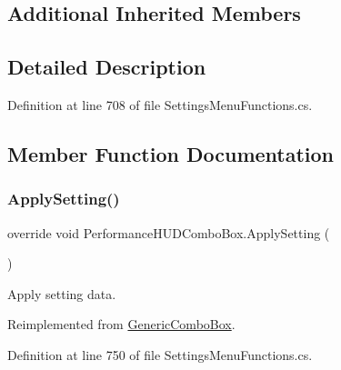 \subsection*{Additional Inherited Members}


\subsection{Detailed Description}


Definition at line 708 of file Settings\+Menu\+Functions.\+cs.



\subsection{Member Function Documentation}
\mbox{\label{class_performance_h_u_d_combo_box_a80ec71a44640dad18ea4da16ecb39fb7}} 
\subsubsection{\texorpdfstring{Apply\+Setting()}{ApplySetting()}}
{\footnotesize\ttfamily override void Performance\+H\+U\+D\+Combo\+Box.\+Apply\+Setting (\begin{DoxyParamCaption}{ }\end{DoxyParamCaption})\hspace{0.3cm}{\ttfamily [virtual]}}



Apply setting data. 



Reimplemented from \hyperlink{class_generic_combo_box_a5aced71f035bd463a4ebaaffe19ec547}{Generic\+Combo\+Box}.



Definition at line 750 of file Settings\+Menu\+Functions.\+cs.

\mbox{\label{class_performance_h_u_d_combo_box_a29adb8a1a56ad279f6a87e4efc1ea5e0}} 
